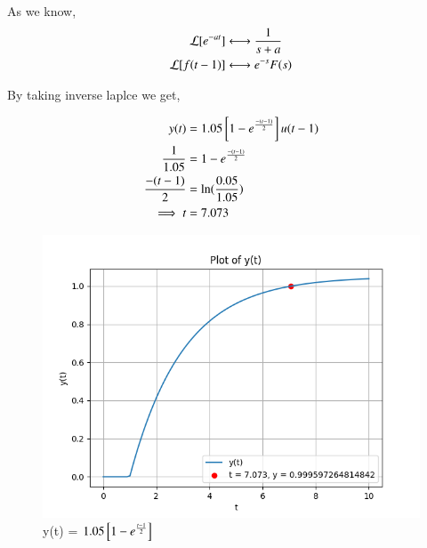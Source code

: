 \documentclass[journal,12pt,twocolumn]{IEEEtran}
\theoremstyle{remark}
\begin{document}
As we know,
\begin{align}
    \mathcal{L}[e^{-at}] &\system{} \frac{1}{s+a} \\
    \mathcal{L}[f(t-1)] &\system{} e^{-s}F(s)
\end{align}

By taking inverse laplce we get,

\begin{align}
    y(t) &= 1.05{}\left[1-e^{\frac{-(t-1)}{2}}\right]u(t-1) \\
    \frac{1}{1.05} &= 1-e^{\frac{-(t-1)}{2}} \\
    \frac{-(t-1)}{2} &= \ln(\frac{0.05}{1.05}) \\
    \implies t &= 7.073 
\end{align}

\begin{figure}[h]
    \centering
    \includegraphics[width=\columnwidth]{2023/CH/62/figs/fig1.png}
    \caption{y(t) = $1.05{}\left[1-e^{\frac{t-1}{2}}\right]$}
    \label{fig:gate23ch62}
\end{figure}

\end{document}

